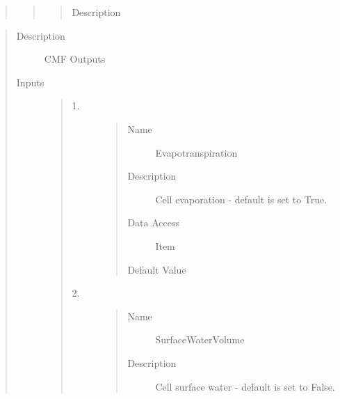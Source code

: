 \documentclass[letterpaper,10pt,english]{sphinxmanual}
\begin{document}
\begin{quote}
\begin{description}
\begin{quote}
\begin{description}
\begin{quote}
\begin{description}
\item[{Description}] \leavevmode
{}

\end{description}\end{quote}

\end{description}\end{quote}

\end{description}\end{quote}

\begin{quote}\begin{description}
\item[{Description}] \leavevmode
CMF Outputs

\item[{Inputs}] \leavevmode\begin{quote}\begin{description}
\item[{1.}] \leavevmode\begin{quote}\begin{description}
\item[{Name}] \leavevmode
Evapotranspiration

\item[{Description}] \leavevmode
Cell evaporation - default is set to True.

\item[{Data Access}] \leavevmode
Item

\item[{Default Value}] \leavevmode
{}

\end{description}\end{quote}

\item[{2.}] \leavevmode\begin{quote}\begin{description}
\item[{Name}] \leavevmode
SurfaceWaterVolume

\item[{Description}] \leavevmode
Cell surface water - default is set to False.


\end{description}
\end{quote}
\end{description}
\end{quote}
\end{description}
\end{quote}
\end{document}
